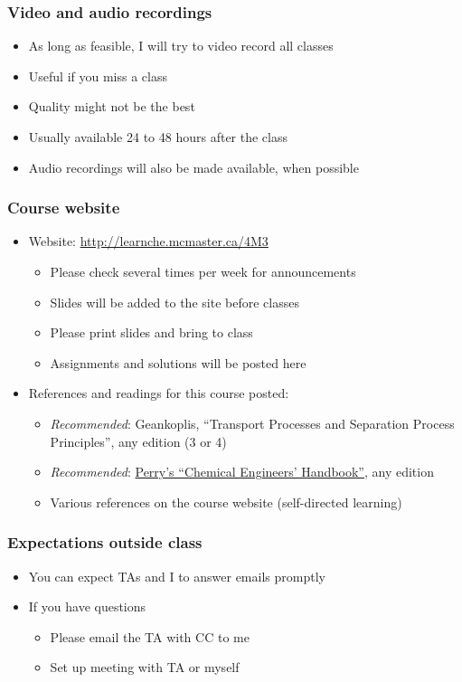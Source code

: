 \begin{frame}\frametitle{Video and audio recordings}
	\begin{itemize}
		\item	As long as feasible, I will try to video record all classes
		\item	Useful if you miss a class
		\item	Quality might not be the best
		\item	Usually available 24 to 48 hours after the class
		\item	Audio recordings will also be made available, when possible
	\end{itemize}
\end{frame}

\begin{frame}\frametitle{Course website}	
	\begin{itemize}
		\item	Website: \href{http://learnche.mcmaster.ca/4M3}{http://learnche.mcmaster.ca/4M3}
			\begin{itemize}
				\item	Please check several times per week for announcements
				\item	Slides will be added to the site before classes
				\item	Please print slides and bring to class
				\item	Assignments and solutions will be posted here
			\end{itemize}
		\item	References and readings for this course posted:
		\begin{itemize}
			\item	\emph{Recommended}: Geankoplis, ``Transport Processes and Separation Process Principles'', any edition (3 or 4)
			\item	\emph{Recommended}: \href{http://accessengineeringlibrary.com/browse/perrys-chemical-engineers-handbook-eighth-edition}{Perry's ``Chemical Engineers' Handbook''}, any edition
			\item	Various references on the course website (self-directed learning)
		\end{itemize}
	\end{itemize}
\end{frame}

\begin{frame}\frametitle{Expectations outside class}
	\begin{itemize}
		\item	You can expect TAs and I to answer emails promptly
		\item	If you have questions
			\begin{itemize}
				\item	Please email the TA with CC to me 
				\item	Set up meeting with TA or myself
			\end{itemize}
	\end{itemize}
\end{frame}

